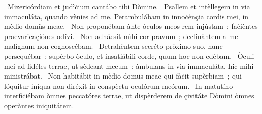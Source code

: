 \psalmChapterWithInscription{}
{ }
{%
~Mizericórdiam et judìċium cantábo tìbi Dòmine. 
~Psallem et intèllegem in via immaculáta, quando vènies ad me. Perambulábam in innoċènçia cordis mei, in mèdio domüs meae. 
~Non proponébam ànte òculos meos rem injústam~; faċièntes praevaricaçiónes odívi. 
~Non adháesit mìhi cor pravum~; declinàntem a me malígnum non cognoscébam. 
~Detrahèntem secréto pròximo suo, hunc persequébar~; supèrbo òculo, et insatiábili corde, quum hoc non edébam. 
~Òculi mei ad fidéles terrae, ut sèdeant mecum~; àmbulans in via immaculáta, hic mìhi ministrábat. 
~Non habitábit in mèdio domüs meae qui fàċit supèrbiam~; qui lóquitur iníqua non diréxit in conspèctu oculórum meórum. 
~In matutíno interfiċiébam òmnes peccatóres terrae, ut dispèrderem de çivitáte Dòmini òmnes operàntes iniquitátem. 
}
